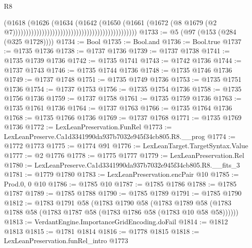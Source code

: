 \begin{lexlean}{R8}
\begin{coremodule}
                                                                                (@1618
                                                                                  (@1626
                                                                                    (@1634
                                                                                      (@1642
                                                                                        (@1650
                                                                                          (@1661
                                                                                            (@1672
                                                                                              (@8
                                                                                                @1679
                                                                                                (@2
                                                                                                  @7)))))))))))))))))))))))))))))))))))))))))))))))
@1733 := @5 (@97 (@153 (@284 (@325 @1728))))
@1734 := Bool
@1735 := Bool.and
@1736 := Bool.true
@1737 := @1735 @1736
@1738 := @1737 @1736
@1739 := @1737 @1738
@1741 := @1735 @1739 @1736
@1742 := @1735 @1741
@1743 := @1742 @1736
@1744 := @1737 @1743
@1746 := @1735 @1744 @1736
@1748 := @1735 @1746 @1736
@1749 := @1737 @1748
@1751 := @1735 @1749 @1736
@1753 := @1735 @1751 @1736
@1754 := @1737 @1753
@1756 := @1735 @1754 @1736
@1758 := @1735 @1756 @1736
@1759 := @1737 @1758
@1761 := @1735 @1759 @1736
@1763 := @1735 @1761 @1736
@1764 := @1737 @1763
@1766 := @1735 @1764 @1736
@1768 := @1735 @1766 @1736
@1769 := @1737 @1768
@1771 := @1735 @1769 @1736
@1772 := LexLeanPreservation.FunRel
@1773 := LexLeanPreserve.Ca1d3341990da937b7032e945f34cb805.R8.__prog
@1774 := @1772 @1773
@1775 := @1774 @91
@1776 := LexLeanTarget.TargetSyntax.Value
@1777 := @2 @1776
@1778 := @1775 @1777
@1779 := LexLeanPreservation.Rel
@1780 := LexLeanPreserve.Ca1d3341990da937b7032e945f34cb805.R8.__fits_3
@1781 := @1779 @1780
@1783 := LexLeanPreservation.encPair @10
@1785 := Prod.{0, 0} @10
@1786 := @1785 @10
@1787 := @1785 @1786
@1788 := @1785 @1787
@1789 := @1785 @1788
@1790 := @1785 @1789
@1791 := @1785 @1790
@1812 := @1783
    @1791
    @58
    (@1783
      @1790
      @58
      (@1783 @1789 @58 (@1783 @1788 @58 (@1783 @1787 @58 (@1783 @1786 @58 (@1783 @10 @58 @58))))))
@1813 := VerdantEngine.ImportanceGridEncoding.doFail
@1814 := @1812 @1813
@1815 := @1781 @1814
@1816 := @1778 @1815
@1818 := LexLeanPreservation.funRel_intro @1773

\end{coremodule}
\end{lexlean}
